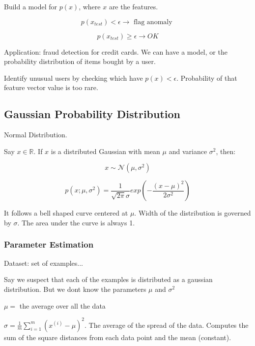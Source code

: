 \documentclass{article}
\begin{document}
Build a model for $p(x)$, where $x$ are the features.

\begin{equation}
    p(x_{test}) < \epsilon \longrightarrow \text{ flag anomaly }
\end{equation}


\begin{equation}
    p(x_{test}) \geq \epsilon \longrightarrow OK
\end{equation}

Application: fraud detection for credit cards. We can have a model, or the probability distribution of items bought by a user.


Identify unusual users by checking which have $p(x) < \epsilon$. Probability of that feature vector value is too rare. 



\subsection{Gaussian Probability Distribution}

Normal Distribution.

Say $x \in \mathbb{R}.$ If $x$ is a distributed Gaussian with mean $\mu$ and variance $\sigma^2$, then:

\begin{equation}
    x \sim \mathcal{N} (\mu, \sigma^2)
\end{equation}



\begin{equation}
    p(x; \mu, \sigma^2)  = \frac{1}{\sqrt{2 \pi} \sigma} exp \left(- \frac{(x-\mu)^2}{2 \sigma^2} \right)
\end{equation}

It follows a bell shaped curve centered at $\mu$. Width of the distribution is governed by $\sigma$. The area under the curve is always 1. 

\subsubsection{Parameter Estimation}

Dataset: set of examples... 

Say we suspect that each of the examples is distributed as a gaussian distribution. But we dont know the parameters $\mu$ and $\sigma^2$

$\mu =$ the average over all the data

$\sigma = \frac{1}{m} \sum_{i=1}^m \left( x^{(i)} - \mu \right)^2$. The average of the spread of the data. Computes the sum of the square distances from each data point and the mean (constant).
\end{document}
